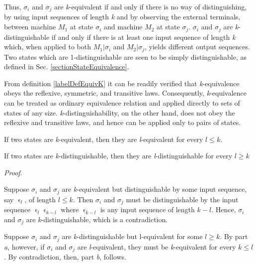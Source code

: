 \documentclass[a4paper]{report}
\begin{document}
    Thus, $\sigma_i$ and $\sigma_j$ are \emph{k}-equivalent if and only if there is no way of distinguishing, by using input sequences of length \emph{k} and by observing the external terminals, between machine $M_1$ at state $\sigma_i$ and machine $M_2$ at state $\sigma_j$. $\sigma_i$ and $\sigma_j$ are \emph{k}-distinguishable if and only if there is at least one input sequence of length \emph{k} which, when applied to both $M_1|\sigma_i$ and $M_2|\sigma_j$, yields different output sequences. Two states which are 1-distinguishable are seen to be simply distinguishable, as defined in Sec. \ref{sectionStateEquivalence}.

    From definition \ref{labelDefEquivK} it can be readily verified that \emph{k}-equivalence obeys the reflexive, symmetric, and transitive laws. Consequently, \emph{k}-equivalence can be treated as ordinary equivalence relation and applied directly to sets of states of any size. \emph{k}-distinguishability, on the other hand, does not obey the reflexive and transitive laws, and hence can be applied only to pairs of states.

    \lemma \label{labelDefEquivLemma} \begin{inparaenum}[a)]
        \item If two states are \emph{k}-equivalent, then they are \emph{l}-equivalent for every $ l \leq k $.
        \item If two states are \emph{k}-distinguishable, then they are \emph{l}-distinguishable for every $ l \geq k $
    \end{inparaenum}

    \emph{Proof}. \begin{inparaenum}[a)] 
        \item Suppose $ \sigma_i $ and $ \sigma_j $ are \emph{k}-equivalent but distinguishable by some input sequence, say $ \upvarepsilon_l $, of length $ l \leq k $. Then $ \sigma_i $ and $ \sigma_j $ must be distinguishable by the input sequence $ \upvarepsilon_l \upvarepsilon_{k-l} $ where $ \upvarepsilon_{k-l} $ is any input sequence of length $k - l$. Hence, $ \sigma_i $ and $ \sigma_j $ are \emph{k}-distinguishable, which is a contradiction. 
        \item Suppose $ \sigma_i $ and $ \sigma_j $ are \emph{k}-distinguishable but l-equivalent for some $ l \geq k $. By part \emph{a}, however, if $ \sigma_i $ and $ \sigma_j $ are \emph{l}-equivalent, they must be \emph{k}-equivalent for every $ k \leq l$. By contradiction, then, part \emph{b}, follows.
    \end{inparaenum}
\end{document}
